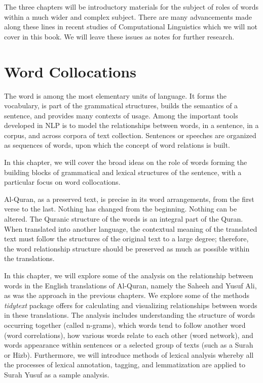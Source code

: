 \documentclass[
]{article}
\begin{document}
The three chapters will be introductory materials for the subject of roles of words within a much wider and complex subject. There are many advancements made along these lines in recent studies of Computational Linguistics which we will not cover in this book. We will leave these issues as notes for further research.

\hypertarget{word-collocations}{%
\section{Word Collocations}\label{word-collocations}}

The word is among the most elementary units of language. It forms the vocabulary, is part of the grammatical structures, builds the semantics of a sentence, and provides many contexts of usage. Among the important tools developed in NLP is to model the relationships between words, in a sentence, in a corpus, and across corpora of text collection. Sentences or speeches are organized as sequences of words, upon which the concept of word relations is built.

In this chapter, we will cover the broad ideas on the role of words forming the building blocks of grammatical and lexical structures of the sentence, with a particular focus on word collocations.

Al-Quran, as a preserved text, is precise in its word arrangements, from the first verse to the last. Nothing has changed from the beginning. Nothing can be altered. The Quranic structure of the words is an integral part of the Quran. When translated into another language, the contextual meaning of the translated text must follow the structures of the original text to a large degree; therefore, the word relationship structure should be preserved as much as possible within the translations.

In this chapter, we will explore some of the analysis on the relationship between words in the English translations of Al-Quran, namely the Saheeh and Yusuf Ali, as was the approach in the previous chapters. We explore some of the methods \emph{tidytext} \citep{tidytext} package offers for calculating and visualizing relationships between words in these translations. The analysis includes understanding the structure of words occurring together (called n-grams), which words tend to follow another word (word correlations), how various words relate to each other (word network), and words appearance within sentences or a selected group of texts (such as a Surah or Hizb). Furthermore, we will introduce methods of lexical analysis whereby all the processes of lexical annotation, tagging, and lemmatization are applied to Surah Yusuf as a sample analysis.
\end{document}
